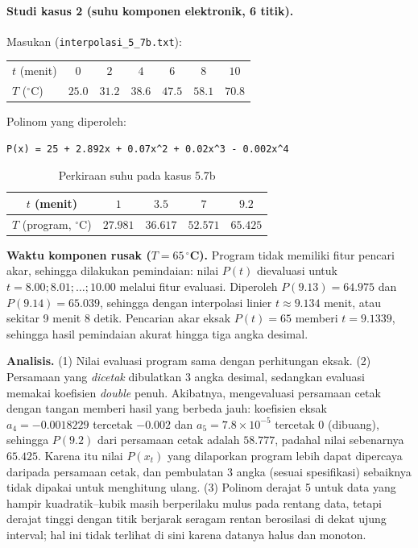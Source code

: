\documentclass[12pt,a4paper]{article}
\begin{document}
\paragraph{Studi kasus 2 (suhu komponen elektronik, 6 titik).} Masukan (\texttt{interpolasi\_5\_7b.txt}):
\begin{center}\small
\begin{tabular}{@{}lcccccc@{}}
\toprule
$t$ (menit) & $0$ & $2$ & $4$ & $6$ & $8$ & $10$\\
$T$ ($^\circ$C) & $25.0$ & $31.2$ & $38.6$ & $47.5$ & $58.1$ & $70.8$\\
\bottomrule
\end{tabular}
\end{center}
Polinom yang diperoleh:
\begin{lstlisting}
P(x) = 25 + 2.892x + 0.07x^2 + 0.02x^3 - 0.002x^4
\end{lstlisting}
\begin{table}[H]
\centering\small
\begin{tabular}{@{}ccccc@{}}
\toprule
$t$ (menit) & $1$ & $3.5$ & $7$ & $9.2$\\
\midrule
$T$ (program, $^\circ$C) & $27.981$ & $36.617$ & $52.571$ & $65.425$\\
\bottomrule
\end{tabular}
\caption{Perkiraan suhu pada kasus 5.7b}
\end{table}
\textbf{Waktu komponen rusak ($T=65\,^\circ$C).} Program tidak memiliki fitur pencari akar, sehingga dilakukan pemindaian: nilai $P(t)$ dievaluasi untuk $t=8.00;8.01;\dots;10.00$ melalui fitur evaluasi. Diperoleh $P(9.13)=64.975$ dan $P(9.14)=65.039$, sehingga dengan interpolasi linier $t\approx9.134$ menit, atau sekitar 9 menit 8 detik. Pencarian akar eksak $P(t)=65$ memberi $t=9.1339$, sehingga hasil pemindaian akurat hingga tiga angka desimal.

\textbf{Analisis.} (1) Nilai evaluasi program sama dengan perhitungan eksak. (2) Persamaan yang \textit{dicetak} dibulatkan 3 angka desimal, sedangkan evaluasi memakai koefisien \textit{double} penuh. Akibatnya, mengevaluasi persamaan cetak dengan tangan memberi hasil yang berbeda jauh: koefisien eksak $a_4=-0.0018229$ tercetak $-0.002$ dan $a_5=7.8\times10^{-5}$ tercetak $0$ (dibuang), sehingga $P(9.2)$ dari persamaan cetak adalah $58.777$, padahal nilai sebenarnya $65.425$. Karena itu nilai $P(x_t)$ yang dilaporkan program lebih dapat dipercaya daripada persamaan cetak, dan pembulatan 3 angka (sesuai spesifikasi) sebaiknya tidak dipakai untuk menghitung ulang. (3) Polinom derajat 5 untuk data yang hampir kuadratik--kubik masih berperilaku mulus pada rentang data, tetapi derajat tinggi dengan titik berjarak seragam rentan berosilasi di dekat ujung interval; hal ini tidak terlihat di sini karena datanya halus dan monoton.
\end{document}
